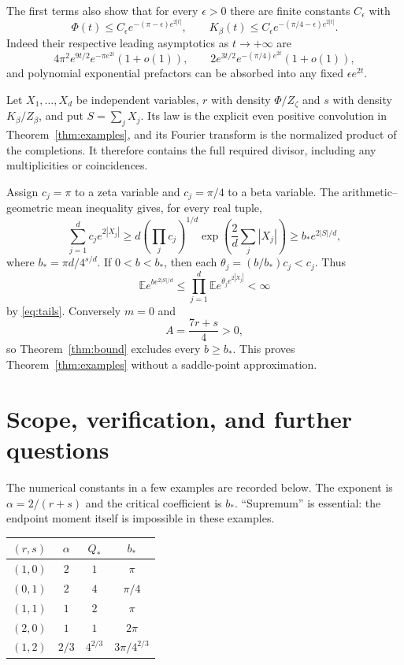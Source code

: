 \documentclass[11pt]{article}
\theoremstyle{remark}\newtheorem{remark}[theorem]{Remark}
\begin{document}
The first terms also show that for every $\epsilon>0$ there are finite constants $C_\epsilon$ with
\begin{equation}\label{eq:tails}
 \Phi(t)\le C_\epsilon e^{-(\pi-\epsilon)e^{2|t|}},\qquad
 K_\beta(t)\le C_\epsilon e^{-(\pi/4-\epsilon)e^{2|t|}}.
\end{equation}
Indeed their respective leading asymptotics as $t\to+\infty$ are
\[
 4\pi^2e^{9t/2}e^{-\pi e^{2t}}(1+o(1)),\qquad
 2e^{3t/2}e^{-(\pi/4)e^{2t}}(1+o(1)),
\]
and polynomial exponential prefactors can be absorbed into any fixed $\epsilon e^{2t}$.

Let $X_1,\ldots,X_d$ be independent variables, $r$ with density $\Phi/Z_\zeta$ and $s$ with density $K_\beta/Z_\beta$, and put $S=\sum_jX_j$. Its law is the explicit even positive convolution in Theorem~\ref{thm:examples}, and its Fourier transform is the normalized product of the completions. It therefore contains the full required divisor, including any multiplicities or coincidences.

Assign $c_j=\pi$ to a zeta variable and $c_j=\pi/4$ to a beta variable. The arithmetic--geometric mean inequality gives, for every real tuple,
\begin{equation}\label{eq:AMGM}
 \sum_{j=1}^dc_j e^{2|X_j|}
 \ge d\left(\prod_jc_j\right)^{1/d}\exp\left(\frac2d\sum_j|X_j|\right)
 \ge b_*e^{2|S|/d},
\end{equation}
where $b_* =\pi d/4^{s/d}$. If $0<b<b_*$, then each $\theta_j=(b/b_*)c_j<c_j$. Thus
\[
 \mathbb E e^{b e^{2|S|/d}}
 \le\prod_{j=1}^d\mathbb E e^{\theta_j e^{2|X_j|}}<\infty
\]
by \eqref{eq:tails}. Conversely $m=0$ and
\[
 A=\frac{7r+s}{4}>0,
\]
so Theorem~\ref{thm:bound} excludes every $b\ge b_*$. This proves Theorem~\ref{thm:examples} without a saddle-point approximation.

\section{Scope, verification, and further questions}

The numerical constants in a few examples are recorded below. The exponent is $\alpha=2/(r+s)$ and the critical coefficient is $b_*$. ``Supremum'' is essential: the endpoint moment itself is impossible in these examples.
\begin{center}
\begin{tabular}{cccc}
\toprule
$(r,s)$ & $\alpha$ & $Q_*$ & $b_*$\\\midrule
$(1,0)$ & $2$ & $1$ & $\pi$\\
$(0,1)$ & $2$ & $4$ & $\pi/4$\\
$(1,1)$ & $1$ & $2$ & $\pi$\\
$(2,0)$ & $1$ & $1$ & $2\pi$\\
$(1,2)$ & $2/3$ & $4^{2/3}$ & $3\pi/4^{2/3}$\\\bottomrule
\end{tabular}
\end{center}
\end{document}
